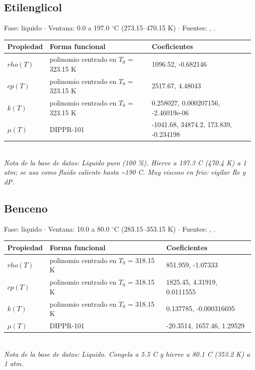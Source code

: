 \documentclass[11pt,a4paper]{article}
\begin{document}
\subsection*{Etilenglicol}
{\small\color{gristexto} Fase: liquido $\cdot$ Ventana:
 0.0 a 197.0 $^\circ$C (273.15--470.15 K)
 $\cdot$ Fuentes: \cite{perry}, \cite{dippr}.}\\[2pt]
\begin{tabular}{llp{7.6cm}}
\toprule
\textbf{Propiedad} & \textbf{Forma funcional} & \textbf{Coeficientes} \\
\midrule
$rho(T)$ & polinomio centrado en $T_0$ = 323.15 K & 1096.52, -0.682146 \\
$cp(T)$ & polinomio centrado en $T_0$ = 323.15 K & 2517.67, 4.48043 \\
$k(T)$ & polinomio centrado en $T_0$ = 323.15 K & 0.258027, 0.000207156, -2.46019e-06 \\
$\mu(T)$ & DIPPR-101 & -1041.68, 34874.2, 173.839, -0.234198 \\
\bottomrule
\end{tabular}\\[3pt]
{\footnotesize\itshape Nota de la base de datos: Liquido puro (100 \%). Hierve a 197.3 C (470.4 K) a 1 atm; se usa como fluido caliente hasta \textasciitilde{}190 C. Muy viscoso en frio: vigilar Re y dP.}
\vspace{0.7em}


\subsection*{Benceno}
{\small\color{gristexto} Fase: liquido $\cdot$ Ventana:
 10.0 a 80.0 $^\circ$C (283.15--353.15 K)
 $\cdot$ Fuentes: \cite{perry}, \cite{dippr}.}\\[2pt]
\begin{tabular}{llp{7.6cm}}
\toprule
\textbf{Propiedad} & \textbf{Forma funcional} & \textbf{Coeficientes} \\
\midrule
$rho(T)$ & polinomio centrado en $T_0$ = 318.15 K & 851.959, -1.07333 \\
$cp(T)$ & polinomio centrado en $T_0$ = 318.15 K & 1825.45, 4.31919, 0.0111555 \\
$k(T)$ & polinomio centrado en $T_0$ = 318.15 K & 0.137785, -0.000316695 \\
$\mu(T)$ & DIPPR-101 & -20.3514, 1657.46, 1.29529 \\
\bottomrule
\end{tabular}\\[3pt]
{\footnotesize\itshape Nota de la base de datos: Liquido. Congela a 5.5 C y hierve a 80.1 C (353.2 K) a 1 atm.}
\vspace{0.7em}
\end{document}
